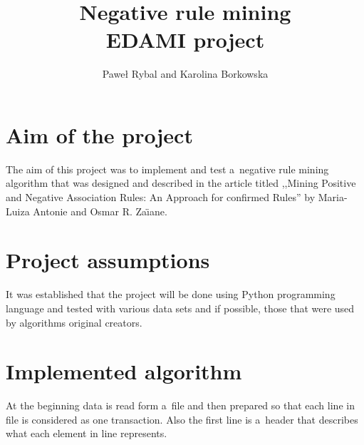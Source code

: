 \documentclass{article}
\date{}
\author{Paweł Rybal and Karolina Borkowska}
\title{Negative rule mining\\
	{\large EDAMI project}}
\begin{document}
 	\maketitle
 	\section{Aim of the project}
 	The aim of this project was to implement and test a~negative rule mining algorithm that was designed and described in the article titled ,,Mining Positive and Negative Association Rules: An Approach for confirmed Rules'' by Maria-Luiza Antonie and Osmar R. Za\"{\i}ane.
 	
 	\section{Project assumptions}
 	It was established that the project will be done using Python programming language and tested with various data sets and if possible, those that were used by algorithms original creators.
 	
 	\section{Implemented algorithm}
	At the beginning data is read form a~file and then prepared so that each line in file is considered as one transaction. Also the first line is a~header that describes what each element in line represents.
	
\end{document}
